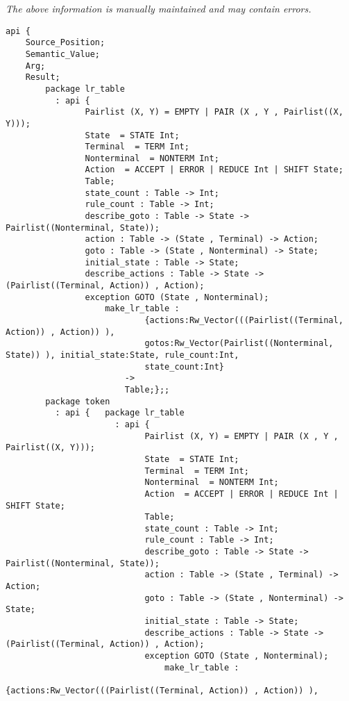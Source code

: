 \label{api:Parser\_Data}

{\tiny \it The above information is manually maintained and may contain errors.}
\begin{verbatim}
api {
    Source_Position;
    Semantic_Value;
    Arg;
    Result;
        package lr_table
          : api {
                Pairlist (X, Y) = EMPTY | PAIR (X , Y , Pairlist((X, Y)));
                State  = STATE Int;
                Terminal  = TERM Int;
                Nonterminal  = NONTERM Int;
                Action  = ACCEPT | ERROR | REDUCE Int | SHIFT State;
                Table;
                state_count : Table -> Int;
                rule_count : Table -> Int;
                describe_goto : Table -> State -> Pairlist((Nonterminal, State));
                action : Table -> (State , Terminal) -> Action;
                goto : Table -> (State , Nonterminal) -> State;
                initial_state : Table -> State;
                describe_actions : Table -> State -> (Pairlist((Terminal, Action)) , Action);
                exception GOTO (State , Nonterminal);
                    make_lr_table :
                            {actions:Rw_Vector(((Pairlist((Terminal, Action)) , Action)) ),
                            gotos:Rw_Vector(Pairlist((Nonterminal, State)) ), initial_state:State, rule_count:Int,
                            state_count:Int}
                        ->
                        Table;};;
        package token
          : api {   package lr_table
                      : api {
                            Pairlist (X, Y) = EMPTY | PAIR (X , Y , Pairlist((X, Y)));
                            State  = STATE Int;
                            Terminal  = TERM Int;
                            Nonterminal  = NONTERM Int;
                            Action  = ACCEPT | ERROR | REDUCE Int | SHIFT State;
                            Table;
                            state_count : Table -> Int;
                            rule_count : Table -> Int;
                            describe_goto : Table -> State -> Pairlist((Nonterminal, State));
                            action : Table -> (State , Terminal) -> Action;
                            goto : Table -> (State , Nonterminal) -> State;
                            initial_state : Table -> State;
                            describe_actions : Table -> State -> (Pairlist((Terminal, Action)) , Action);
                            exception GOTO (State , Nonterminal);
                                make_lr_table :
                                        {actions:Rw_Vector(((Pairlist((Terminal, Action)) , Action)) ),

\end{verbatim}
